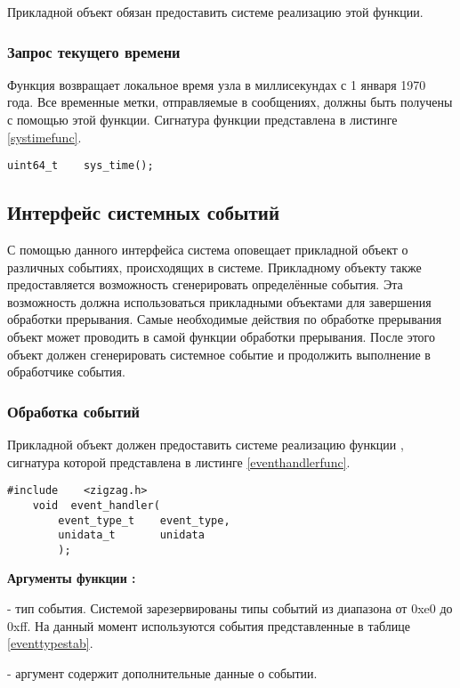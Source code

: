Прикладной объект обязан предоставить системе \zigzag реализацию этой функции.

\subsubsection{Запрос текущего времени}

Функция  возвращает локальное время узла в миллисекундах с 1 января 1970 года.
Все временные метки, отправляемые в сообщениях, должны быть получены с помощью этой функции.
Сигнатура функции представлена в листинге \ref{systimefunc}.

\begin{lstlisting}[caption=\myfunc{sys\_time()} - текущее время, label=systimefunc ]
    uint64_t    sys_time();
\end{lstlisting}

\subsection{Интерфейс системных событий}
\label{SysEventSect}

С помощью данного интерфейса система \zigzag оповещает прикладной объект о различных событиях, происходящих в системе.
Прикладному объекту также предоставляется возможность сгенерировать определённые события. Эта возможность должна использоваться
прикладными объектами для завершения обработки прерывания. Самые необходимые действия по обработке прерывания объект может
проводить в самой функции обработки прерывания. После этого объект должен сгенерировать системное событие и продолжить выполнение
в обработчике события.

\subsubsection{Обработка событий}

Прикладной объект должен предоставить системе \zigzag реализацию функции , сигнатура
которой представлена в листинге \ref{eventhandlerfunc}.

\begin{lstlisting}[caption=Функция \myfunc{event\_handler()} - обработчик событий., label=eventhandlerfunc ]
    #include    <zigzag.h>
    void  event_handler(
        event_type_t    event_type,
        unidata_t       unidata
        );
\end{lstlisting}

{\bfseries Аргументы функции :}
\begin{enumerate}
{\itshape
\item {} - тип события. Системой \zigzag зарезервированы типы событий из диапазона от 0xe0 до 0xff. На 
данный момент используются события представленные в таблице \ref{eventtypestab}.
\item {} - аргумент содержит дополнительные данные о событии.
}
\end{enumerate}


